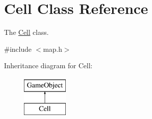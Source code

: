 \hypertarget{class_cell}{\section{\-Cell \-Class \-Reference}
\label{class_cell}
}


\-The \hyperlink{class_cell}{\-Cell} class.  




{\ttfamily \#include $<$map.\-h$>$}

\-Inheritance diagram for \-Cell\-:\begin{figure}[H]
\begin{center}
\leavevmode
\includegraphics[height=2.000000cm]{class_cell}
\end{center}
\end{figure}
